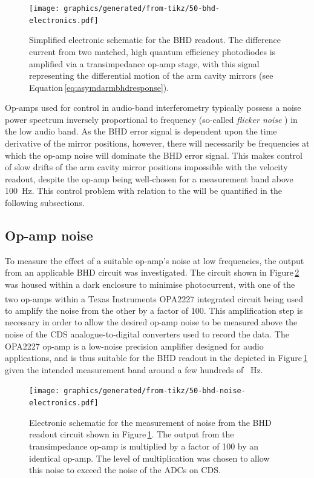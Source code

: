 \begin{figure}
  \centering
  \texttt{[image: graphics/generated/from-tikz/50-bhd-electronics.pdf]}
  \caption[Electronic schematic for the balanced homodyne readout]{\label{fig:bhd-electronics}Simplified electronic schematic for the BHD readout. The difference current from two matched, high quantum efficiency photodiodes is amplified via a transimpedance op-amp stage, with this signal representing the differential motion of the arm cavity mirrors (see Equation\,\ref{eq:asymdarmbhdresponse}).}
\end{figure}

Op-amps used for control in audio-band interferometry typically possess a noise power spectrum inversely proportional to frequency (so-called \emph{flicker noise} \cite[Section\,11.2.3]{Gray2009}) in the low audio band. As the \gls{BHD} error signal is dependent upon the time derivative of the mirror positions, however, there will necessarily be frequencies at which the op-amp noise will dominate the \gls{BHD} error signal. This makes control of slow drifts of the arm cavity mirror positions impossible with the velocity readout, despite the op-amp being well-chosen for a measurement band above \SI{100}{\hertz}. This control problem with relation to the \SSMEXPT{} will be quantified in the following subsections.

\subsection{\label{sec:op-amp-noise}Op-amp noise}
To measure the effect of a suitable op-amp's noise at low frequencies, the output from an applicable \gls{BHD} circuit was investigated. The circuit shown in Figure\,\ref{fig:bhd-noise-electronics} was housed within a dark enclosure to minimise photocurrent, with one of the two op-amps within a Texas Instruments\textsuperscript{\textregistered} OPA2227 integrated circuit being used to amplify the noise from the other by a factor of \SI{100}{}. This amplification step is necessary in order to allow the desired op-amp noise to be measured above the noise of the \gls{CDS} analogue-to-digital converters used to record the data. The OPA2227 op-amp is a low-noise precision amplifier designed for audio applications, and is thus suitable for the \gls{BHD} readout in the \SSMEXPT{} depicted in Figure\,\ref{fig:bhd-electronics} given the intended measurement band around a few hundreds of \SI{}{\hertz}.

\begin{figure}
  \centering
  \texttt{[image: graphics/generated/from-tikz/50-bhd-noise-electronics.pdf]}
  \caption[Electronic schematic for the measurement of noise from the balanced homodyne readout]{\label{fig:bhd-noise-electronics}Electronic schematic for the measurement of noise from the BHD readout circuit shown in Figure\,\ref{fig:bhd-electronics}. The output from the transimpedance op-amp is multiplied by a factor of \num{100} by an identical op-amp. The level of multiplication was chosen to allow this noise to exceed the noise of the ADCs on CDS.}
\end{figure}

